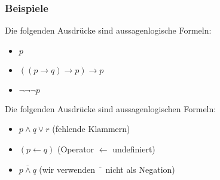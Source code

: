\documentclass[aspectratio=1610,onlymath]{beamer}
\begin{document}
\begin{frame}\frametitle{Beispiele}

Die folgenden Ausdrücke sind aussagenlogische Formeln:
\begin{itemize}
\item $p$
\item $((p\to q)\to p)\to p$
\item $\neg \neg \neg p$
\end{itemize}
\medskip

Die folgenden Ausdrücke sind  aussagenlogischen Formeln:
\begin{itemize}
\item $p\wedge q \vee r$ (fehlende Klammern)\\
\item $(p\leftarrow q)$ (Operator $\leftarrow$ undefiniert)
\item $\overline{p\wedge q}$ (wir verwenden $\overline{\phantom{x}}$ nicht als Negation)
\end{itemize}

\end{frame}
\end{document}
